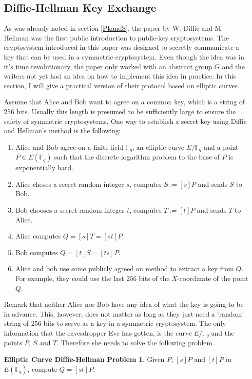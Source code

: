 \documentclass{article}
\numberwithin{equation}{section}
\theoremstyle{definition}
\newtheorem*{DFproblem}{Elliptic Curve Diffie-Hellman Problem}
\newcommand{\FF}[1]{{\mathbb F}_{#1}} %
\begin{document}
\subsection{Diffie-Hellman Key Exchange}\label{Diffie-Hellman}
As was already noted in section \ref{PkandS}, the paper \cite{DiffieHellman} by W. Diffie and M. Hellman was the first public introduction to public-key cryptosystems. The cryptosystem introduced in this paper was designed to secretly communicate a key that can be used in a symmetric cryptosystem. Even though the idea was in it's time revolutionary, the paper only worked with an abstract group $G$ and the writers not yet had an idea on how to implement this idea in practice. In this section, I will give a practical version of their protocol based on elliptic curves.\par 
Assume that Alice and Bob want to agree on a common key, which is a string of 256 bits. Usually this length is presumed to be sufficiently large to ensure the safety of symmetric cryptosystems. One way to establish a secret key using Diffie and Hellman's method is the following:
\begin{enumerate}
\item Alice and Bob agree on a finite field $\FF{q}$, an elliptic curve $E/\FF{q}$ and a point $P \in E(\FF{q})$ such that the discrete logarithm problem to the base of $P$ is exponentially hard.
\item Alice choses a secret random integer $s$, computes $S:=[s]P$ and sends $S$ to Bob.
\item Bob chooses a secret random integer $t$, computes $T:=[t]P$ and sends $T$ to Alice.
\item Alice computes $Q=[s]T=[st]P$.
\item Bob computes $Q=[t]S = [ts]P$.
\item Alice and bob use some publicly agreed on method to extract a key from $Q$. For example, they could use the last $256$ bits of the $X$-coordinate of the point $Q$. 
\end{enumerate}

Remark that neither Alice nor Bob have any idea of what the key is going to be in advance. This, however, does not matter as long as they just need a `random' string of 256 bits to serve as a key in a symmetric cryptosystem. The only information that the eavesdropper Eve has gotten, is the curve $E/\FF{q}$ and the points $P$, $S$ and $T$. Therefore she needs to solve the following problem.

\begin{DFproblem}
Given $P$, $[s]P$ and $[t]P$ in $E(\FF{q})$, compute $Q=[st]P$.
\end{DFproblem}
\end{document}
